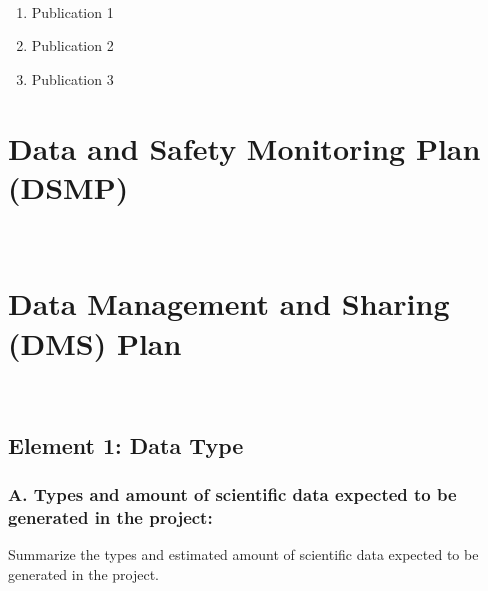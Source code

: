 ~

\begin{enumerate}
   
    \item Publication 1

    \item Publication 2

    \item Publication 3

\end{enumerate}

\newpage

\section*{Data and Safety Monitoring Plan (DSMP)}

~

\lipsum[2]

\newpage

\section*{Data Management and Sharing (DMS) Plan}

~ 

\subsection*{Element 1: Data Type}

\subsubsection*{A. Types and amount of scientific data expected to be generated in the project:} 

Summarize the types and estimated amount of scientific data expected to be generated in the project.

